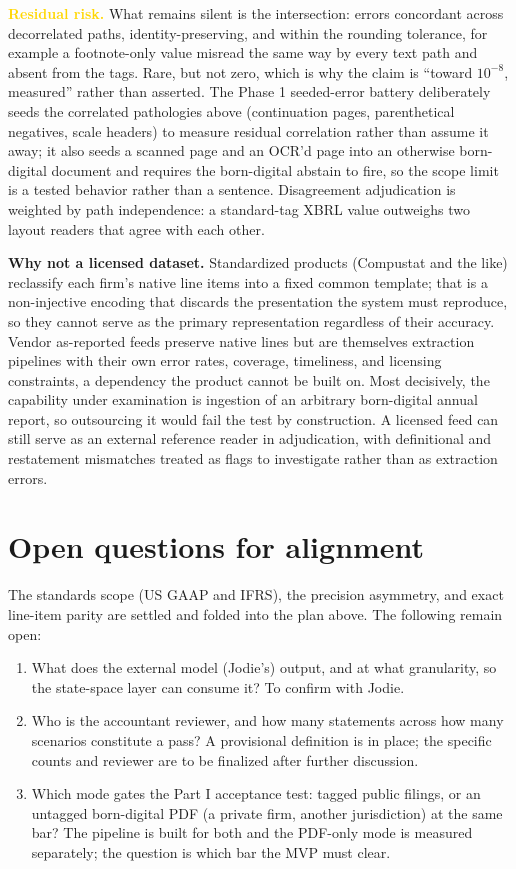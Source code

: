 \documentclass[11pt]{article}
\newcommand{\lead}[2]{\par\addvspace{5pt}\textbf{\textcolor{#1}{#2}}}
\begin{document}
\lead{gold}{Residual risk.} What remains silent is the intersection: errors concordant across decorrelated paths, identity-preserving, and within the rounding tolerance, for example a footnote-only value misread the same way by every text path and absent from the tags. Rare, but not zero, which is why the claim is ``toward $10^{-8}$, measured'' rather than asserted. The Phase 1 seeded-error battery deliberately seeds the correlated pathologies above (continuation pages, parenthetical negatives, scale headers) to measure residual correlation rather than assume it away; it also seeds a scanned page and an OCR'd page into an otherwise born-digital document and requires the born-digital abstain to fire, so the scope limit is a tested behavior rather than a sentence. Disagreement adjudication is weighted by path independence: a standard-tag XBRL value outweighs two layout readers that agree with each other.

\lead{navytwo}{Why not a licensed dataset.} Standardized products (Compustat and the like) reclassify each firm's native line items into a fixed common template; that is a non-injective encoding that discards the presentation the system must reproduce, so they cannot serve as the primary representation regardless of their accuracy. Vendor as-reported feeds preserve native lines but are themselves extraction pipelines with their own error rates, coverage, timeliness, and licensing constraints, a dependency the product cannot be built on. Most decisively, the capability under examination is ingestion of an arbitrary born-digital annual report, so outsourcing it would fail the test by construction. A licensed feed can still serve as an external reference reader in adjudication, with definitional and restatement mismatches treated as flags to investigate rather than as extraction errors.

\section{Open questions for alignment}
The standards scope (US GAAP and IFRS), the precision asymmetry, and exact line-item parity are settled and folded into the plan above. The following remain open:
\begin{enumerate}
  \item What does the external model (Jodie's) output, and at what granularity, so the state-space layer can consume it? To confirm with Jodie.
  \item Who is the accountant reviewer, and how many statements across how many scenarios constitute a pass? A provisional definition is in place; the specific counts and reviewer are to be finalized after further discussion.
  \item Which mode gates the Part I acceptance test: tagged public filings, or an untagged born-digital PDF (a private firm, another jurisdiction) at the same bar? The pipeline is built for both and the PDF-only mode is measured separately; the question is which bar the MVP must clear.
\end{enumerate}
\end{document}

